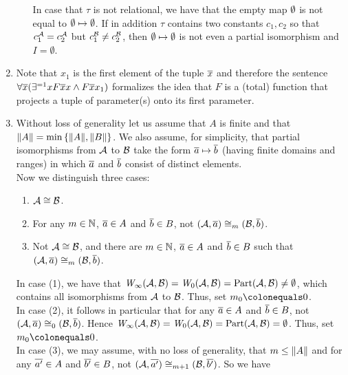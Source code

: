 \begin{enumerate}[1.]
\begin{enumerate}[(1)]
In case that $\tau$ is not relational, we have that the empty map $\emptyset$ is not equal to $\emptyset \mapsto \emptyset$. If in addition $\tau$ contains two constants $c_1, c_2$ so that $c_1^{\mathcal{A}} = c_2^{\mathcal{A}}$ but $c_1^{\mathcal{B}} \neq c_2^{\mathcal{B}}$, then $\emptyset \mapsto \emptyset$ is not even a partial isomorphism and $I = \emptyset$.
\end{enumerate}
%
\item {} Note that $x_1$ is the first element of the tuple $\overline{x}$ and therefore the sentence $\forall \overline{x} (\exists^{= 1}x F\overline{x}x \land F\overline{x}x_1)$ formalizes the idea that $F$ is a (total) function that projects a tuple of parameter(s) onto its first parameter.
%
\item {} Without loss of generality let us assume that $A$ is finite and that $\|A\| = \min{\{\|A\|, \|B\|\}}$. We also assume, for simplicity, that partial isomorphisms from $\mathcal{A}$ to $\mathcal{B}$ take the form $\overline{a} \mapsto \overline{b}$ (having finite domains and ranges) in which $\overline{a}$ and $\overline{b}$ consist of distinct elements.
\medskip\\
Now we distinguish three cases:
\begin{enumerate}[(1)]
\item $\strct{A} \isom \strct{B}$.
\item For any $m \in \mathbb{N}$, $\overline{a} \in A$ and $\overline{b} \in B$, not $(\strct{A}, \vect{a}) \isom_m (\strct{B}, \vect{b})$.
\item Not $\strct{A} \isom \strct{B}$, and there are $m \in \mathbb{N}$, $\overline{a} \in A$ and $\overline{b} \in B$ such that $(\strct{A}, \vect{a}) \isom_m (\strct{B}, \vect{b})$.
\end{enumerate}
In case (1), we have that $\winpos{\infty}(\strct{A}, \strct{B}) = \winpos{0}(\strct{A}, \strct{B}) = \partisoms(\strct{A}, \strct{B}) \neq \emptyset$, which contains all isomorphisms from $\mathcal{A}$ to $\mathcal{B}$. Thus, set $m_0 \defas 0$.
\medskip\\
In case (2), it follows in particular that for any $\overline{a} \in A$ and $\overline{b} \in B$, not $(\strct{A}, \vect{a}) \isom_0 (\strct{B}, \vect{b})$. Hence $\winpos{\infty}(\strct{A}, \strct{B}) = \winpos{0}(\strct{A}, \strct{B}) = \partisoms(\strct{A}, \strct{B}) = \emptyset$. Thus, set $m_0 \defas 0$.
\medskip\\
In case (3), we may assume, with no loss of generality, that $m \leq \|A\|$ and for any $\overline{a'} \in A$ and $\overline{b'} \in B$, not $(\strct{A}, \vect{a'}) \isom_{m + 1} (\strct{B}, \vect{b'})$. So we have

\end{enumerate}
